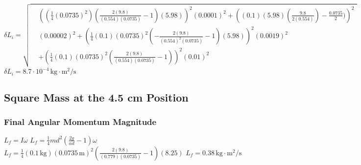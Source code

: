 \documentclass[12pt]{article}
\begin{document}
\begin{equation}
\delta L_i = \sqrt{
    \begin{aligned}
        &\left( (\frac{1}{4}(0.0735)^2)(\frac{2(9.8)}{(0.554)(0.0735)} - 1)(5.98)\right)^2(0.0001)^2 + \left( (0.1)(5.98)(\frac{9.8}{2(0.554)})-\frac{0.0735} {2})\right)^2 \\ & (0.00002)^2 + \left( \frac{1}{4}(0.1)(0.0735)^2 (-\frac {2(9.8)}{(0.554)^2 (0.0735)}-1)(5.98)\right)^2(0.0019)^2 \\ &+ \left( \frac{1}{4}(0.1)(0.0735)^2(\frac{2(9.8)}{(0.554)(0.0735)}-1)\right)^2(0.01)^2
    \end{aligned}
}
\end{equation}
$\delta L_i = 8.7 \cdot 10^{-4} \, \text{kg} \cdot \text{m}^2/\text{s}$
\subsection{Square Mass at the 4.5 cm Position}
\subsubsection{Final Angular Momentum Magnitude}
$L_f = I\omega$
\newline
$L_f = \frac{1}{4}md^2(\frac{2g}{\alpha d}-1)\omega$
\newline
$L_f = \frac{1}{4}(0.1 \, \text{kg})(0.0735 \, \text{m})^2\left(\frac{2(9.8)}{(0.779)(0.0735)} -1 \right)(8.25)$
\newline
$L_f = 0.38 \, \text{kg} \cdot \text{m}^2 / \text{s}$
\end{document}
